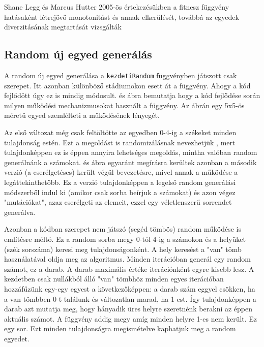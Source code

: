 \documentclass[12pt,a4paper,oneside]{report}
\begin{document}
Shane Legg és Marcus Hutter 2005-ös értekezésükben a fitnesz függvény hatásaként létrejövő monotonitást és annak elkerülését, továbbá az egyedek diverzitásának megtartását vizsgálták\cite{Legg:2005:FUD:1068009.1068216}


        
        \subsection{Random új egyed generálás} %
        
        A random új egyed generálása a \texttt{kezdetiRandom} függvényben játszott csak szerepet.
        Itt azonban különböző stádiumokon esett át a függvény. Ahogy a kód fejlődött úgy ez is mindig módosult.
         és  ábra bemutatja hogy a kód fejlődése során milyen működési mechanizmusokat használt a függvény.
        Az ábrán egy 5x5-ös méretű egyed szemlélteti a működésének lényegét.
        
        
        Az első változat még csak feltöltötte az egyedben 0-4-ig a székeket minden tulajdonság estén.
        Ezt a megoldást is randomizálásnak nevezhetjük , mert tulajdonképpen ez is éppen annyira lehetséges megoldás, mintha valóban random generálnánk a számokat.
         és  ábra egyaránt megírásra kerültek azonban a második verzió (a cserélgetéses) került végül bevezetésre, mivel annak a működése a legáttekinthetőbb.
        Ez a verzió tulajdonképpen a legelső random generálási módszerből indul ki (amikor csak sorba beírjuk a számokat) és azon végez "mutációkat", azaz cserélgeti az elemeit, ezzel egy véletlenszerű sorrendet generálva.
        
        
        Azonban a kódban szerepet nem játszó (segéd tömbös) random
        működése is említésre méltó.
        Ez a random sorba megy 0-tól 4-ig a számokon és a helyüket (szék sorszáma) keresi meg tulajdonságonként.
        A hely keresést a "van" tömb használatával oldja meg az algoritmus.
        Minden iterációban generál egy random számot, ez a darab.
        A darab maximális értéke iterációnként egyre kisebb lesz.
        A kezdetben csak nullákból álló "van" tömbhöz minden egyes iterációban hozzáfűzünk egy-egy egyest a következőképpen: a darab szám eggyel csökken, ha a van tömbben 0-t találunk és változatlan marad, ha 1-est.
        Így tulajdonképpen a darab azt mutatja meg, hogy hányadik üres helyre szeretnénk berakni az éppen aktuális számot.
        A függvény addig megy amíg minden helyre 1-es nem került.
        Ez egy sor.
        Ezt minden tulajdonságra megismételve kaphatjuk meg a random egyedet.
            
\end{document}

